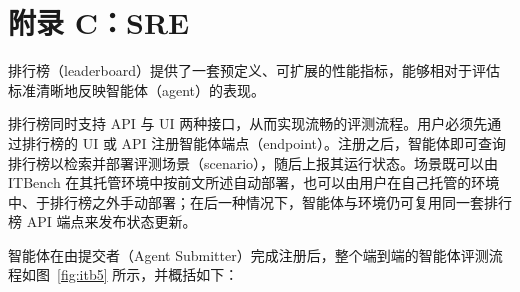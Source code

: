 \section{附录 C：SRE}

排行榜（leaderboard）提供了一套预定义、可扩展的性能指标，能够相对于评估标准清晰地反映智能体（agent）的表现。

排行榜同时支持 API 与 UI 两种接口，从而实现流畅的评测流程。用户必须先通过排行榜的 UI 或 API 注册智能体端点（endpoint）。注册之后，智能体即可查询排行榜以检索并部署评测场景（scenario），随后上报其运行状态。场景既可以由 ITBench 在其托管环境中按前文所述自动部署，也可以由用户在自己托管的环境中、于排行榜之外手动部署；在后一种情况下，智能体与环境仍可复用同一套排行榜 API 端点来发布状态更新。

智能体在由提交者（Agent Submitter）完成注册后，整个端到端的智能体评测流程如图~\ref{fig:itb5} 所示，并概括如下：

